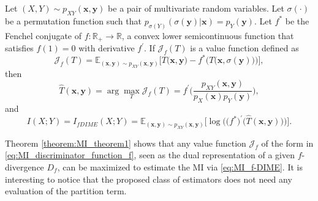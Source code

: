 \begin{theorem}
\label{theorem:MI_theorem1}
Let $(X,Y) \sim p_{XY}(\mathbf{x},\mathbf{y})$ be a pair of multivariate random variables. Let $\sigma(\cdot)$ be a permutation function such that  $p_{\sigma(Y)}(\sigma(\mathbf{y})|\mathbf{x}) = p_{Y}(\mathbf{y})$. Let $f^*$ be the Fenchel conjugate of $f:\mathbb{R}_+ \to \mathbb{R}$, a convex lower semicontinuous function that satisfies $f(1)=0$ with derivative $f^{\prime}$.
If $\mathcal{J}_{f}(T)$ is a value function defined as 
\begin{equation}
\mathcal{J}_{f}(T) =  \mathbb{E}_{(\mathbf{x},\mathbf{y}) \sim p_{XY}(\mathbf{x},\mathbf{y})}\biggl[T\bigl(\mathbf{x},\mathbf{y}\bigr)-f^*\biggl(T\bigl(\mathbf{x},\sigma(\mathbf{y})\bigr)\biggr)\biggr],
\label{eq:MI_discriminator_function_f}
\end{equation}
then
\begin{equation}
\label{eq:MI_optimal_ratio_T}
\hat{T}(\mathbf{x},\mathbf{y}) =\arg \max_T \mathcal{J}_f(T) = f^{\prime} \biggl(\frac{p_{XY}(\mathbf{x},\mathbf{y})}{p_X(\mathbf{x})p_Y(\mathbf{y})}\biggr),
\end{equation}
and
\begin{equation}
\label{eq:MI_f-DIME}
I(X;Y) = I_{fDIME}(X;Y) =  \mathbb{E}_{(\mathbf{x},\mathbf{y}) \sim p_{XY}(\mathbf{x},\mathbf{y})}\biggl[ \log \biggl(\bigl(f^{*}\bigr)^{\prime}\bigl(\hat{T}(\mathbf{x},\mathbf{y})\bigr) \biggr) \biggr].
\end{equation}
\end{theorem}

Theorem \ref{theorem:MI_theorem1} shows that any value function $\mathcal{J}_f$ of the form in \eqref{eq:MI_discriminator_function_f}, seen as the dual representation of a given $f$-divergence $D_f$, can be maximized to estimate the MI via \eqref{eq:MI_f-DIME}. It is interesting to notice that the proposed class of estimators does not need any evaluation of the partition term.
 
